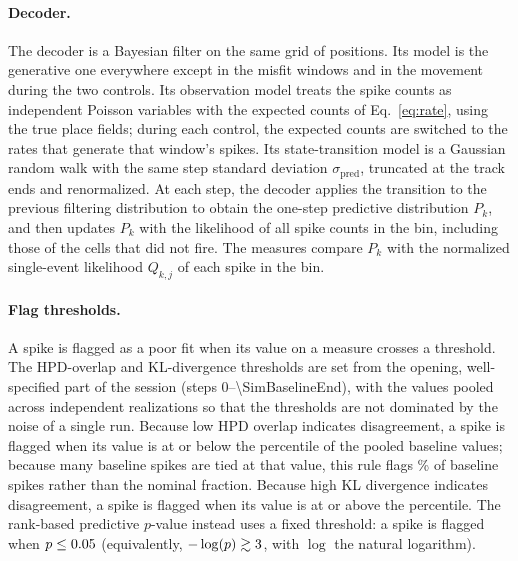 \documentclass[12pt]{article}
\begin{document}
\paragraph{Decoder.}
The decoder is a Bayesian filter on the same grid of positions. Its model is the generative one everywhere except in the misfit windows and in the movement during the two controls. Its observation model treats the spike counts as independent Poisson variables with the expected counts of Eq.~\eqref{eq:rate}, using the true place fields; during each control, the expected counts are switched to the rates that generate that window's spikes. Its state-transition model is a Gaussian random walk with the same step standard deviation $\sigma_{\mathrm{pred}}$, truncated at the track ends and renormalized. At each step, the decoder applies the transition to the previous filtering distribution to obtain the one-step predictive distribution $P_k$, and then updates $P_k$ with the likelihood of all spike counts in the bin, including those of the cells that did not fire. The measures compare $P_k$ with the normalized single-event likelihood $Q_{k,j}$ of each spike in the bin.

\paragraph{Flag thresholds.}
A spike is flagged as a poor fit when its value on a measure crosses a threshold. The HPD-overlap and KL-divergence thresholds are set from the opening, well-specified part of the session (steps 0--\num{\SimBaselineEnd}), with the values pooled across \SimNRealizations{} independent realizations so that the thresholds are not dominated by the noise of a single run. Because low HPD overlap indicates disagreement, a spike is flagged when its value is at or below the \SimHpdPercentile{} percentile of the pooled baseline values; because many baseline spikes are tied at that value, this rule flags \SimHpdBaselineFlagPercent\% of baseline spikes rather than the nominal fraction. Because high KL divergence indicates disagreement, a spike is flagged when its value is at or above the \SimKlPercentile{} percentile. The rank-based predictive $p$-value instead uses a fixed threshold: a spike is flagged when $p \leq 0.05$ (equivalently, $-\log(p) \gtrsim 3$, with $\log$ the natural logarithm).
\end{document}
